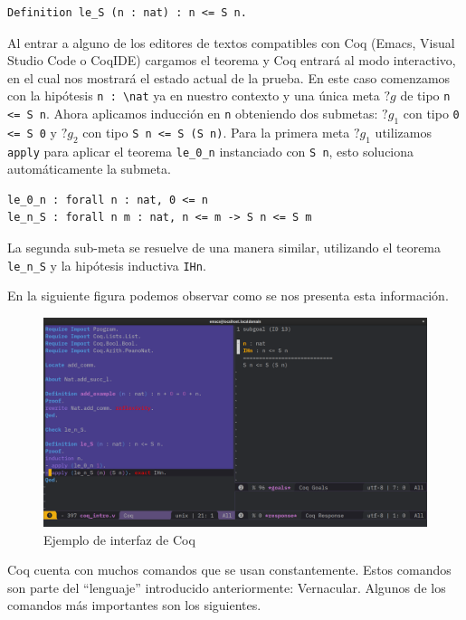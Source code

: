 \begin{lstlisting}[frame=tb,caption={Teorema ejemplo},label=lst:le_S]
Definition le_S (n : nat) : n <= S n.
\end{lstlisting}

Al entrar a alguno de los editores de textos compatibles con Coq (Emacs, Visual Studio Code o CoqIDE) cargamos el teorema y Coq entrará al modo interactivo, en el cual nos mostrará el estado actual de la prueba.
En este caso comenzamos con la hipótesis \lstinline{n : \nat} ya en nuestro contexto y una única meta $?g$ de tipo \lstinline{n <= S n}.
Ahora aplicamos inducción en \lstinline{n} obteniendo dos submetas: $?g_1$ con tipo \lstinline{0 <= S 0} y $?g_2$ con tipo \lstinline{S n <= S (S n)}.
Para la primera meta $?g_1$ utilizamos \lstinline{apply} para aplicar el teorema \lstinline{le_0_n} instanciado con \lstinline{S n}, esto soluciona automáticamente la submeta.

\begin{lstlisting}[caption={Teoremas \lstinline{le_0_n} y \lstinline{le_n_S}}]
le_0_n : forall n : nat, 0 <= n
le_n_S : forall n m : nat, n <= m -> S n <= S m
\end{lstlisting}

La segunda sub-meta se resuelve de una manera similar, utilizando el teorema \lstinline{le_n_S} y la hipótesis inductiva \lstinline{IHn}.

En la siguiente figura podemos observar como se nos presenta esta información.

\begin{figure}[h]
  \centering
  \includegraphics[width=1\textwidth]{gfx/coq_emacs_example.png}
  \caption{Ejemplo de interfaz de Coq}
  \label{fig:ui}
\end{figure}

Coq cuenta con muchos comandos que se usan constantemente. Estos comandos son parte del ``lenguaje'' introducido anteriormente: Vernacular. Algunos de los comandos más importantes son los siguientes.

